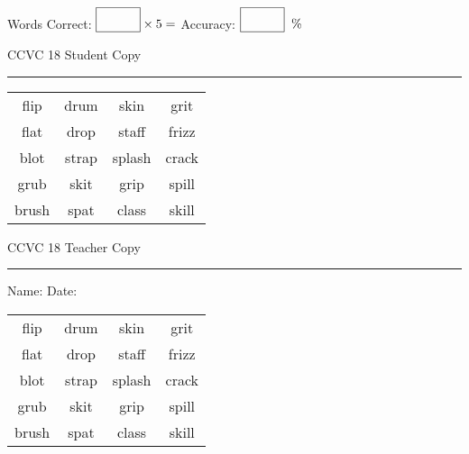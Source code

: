 \documentclass{memoir}
\begin{document}
\normalsize

Words Correct: $\fbox{\phantom{\huge 100}} \times 5 = $ Accuracy: $\fbox{\phantom{\huge 100}}\;\; \%$ 

\vfill

\newpage


\footnotesize \noindent
CCVC 18 \hfill Student Copy
\smallskip
\hrule

\Large

\setlength{\tabcolsep}{14pt}
\def\arraystretch{3}

{\selectfont


\begin{vplace}[0.5]
\begin{center}
\begin{tabular}{cccc}
flip & drum & skin & grit      \\
flat             & drop & staff            & frizz \\
blot & strap & splash & crack       \\
grub & skit & grip      & spill \\
brush & spat            & class             & skill \\
\end{tabular}
\end{center}
\end{vplace}

}

\newpage

\footnotesize \noindent
CCVC 18 \hfill Teacher Copy
\smallskip
\hrule

\normalsize

\vfill

\noindent
Name: \underline{\hspace{1.75in}} \hfill Date: \underline{\hspace{1in}}

\Large

{\selectfont


\begin{vplace}[0.5]
\begin{center}
\begin{tabular}{cccc}
flip & drum & skin & grit      \\
flat             & drop & staff            & frizz \\
blot & strap & splash & crack       \\
grub & skit & grip      & spill \\
brush & spat            & class             & skill \\
\end{tabular}
\end{center}
\end{vplace}



}
\end{document}
